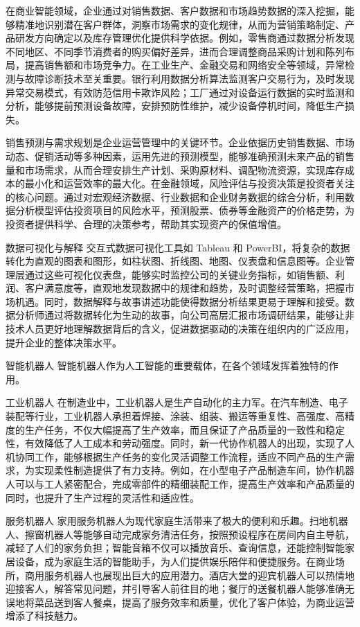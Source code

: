 在商业智能领域，企业通过对销售数据、客户数据和市场趋势数据的深入挖掘，能够精准地识别潜在客户群体，洞察市场需求的变化规律，从而为营销策略制定、产品研发方向确定以及库存管理优化提供科学依据。例如，零售商通过数据分析发现不同地区、不同季节消费者的购买偏好差异，进而合理调整商品采购计划和陈列布局，提高销售额和市场竞争力。在工业生产、金融交易和网络安全等领域，异常检测与故障诊断技术至关重要。银行利用数据分析算法监测客户交易行为，及时发现异常交易模式，有效防范信用卡欺诈风险；工厂通过对设备运行数据的实时监测和分析，能够提前预测设备故障，安排预防性维护，减少设备停机时间，降低生产损失。



销售预测与需求规划是企业运营管理中的关键环节。企业依据历史销售数据、市场动态、促销活动等多种因素，运用先进的预测模型，能够准确预测未来产品的销售量和市场需求，从而合理安排生产计划、采购原材料、调配物流资源，实现库存成本的最小化和运营效率的最大化。在金融领域，风险评估与投资决策是投资者关注的核心问题。通过对宏观经济数据、行业数据和企业财务数据的综合分析，利用数据分析模型评估投资项目的风险水平，预测股票、债券等金融资产的价格走势，为投资者提供科学、合理的决策参考，帮助其实现资产的保值增值。


数据可视化与解释
交互式数据可视化工具如 Tableau 和 PowerBI，将复杂的数据转化为直观的图表和图形，如柱状图、折线图、地图、仪表盘和信息图等。企业管理层通过这些可视化仪表盘，能够实时监控公司的关键业务指标，如销售额、利润、客户满意度等，直观地发现数据中的规律和趋势，及时调整经营策略，把握市场机遇。同时，数据解释与故事讲述功能使得数据分析结果更易于理解和接受。数据分析师通过将数据转化为生动的故事，向公司高层汇报市场调研结果，能够让非技术人员更好地理解数据背后的含义，促进数据驱动的决策在组织内的广泛应用，提升企业的整体决策水平。


智能机器人
智能机器人作为人工智能的重要载体，在各个领域发挥着独特的作用。


工业机器人
在制造业中，工业机器人是生产自动化的主力军。在汽车制造、电子装配等行业，工业机器人承担着焊接、涂装、组装、搬运等重复性、高强度、高精度的生产任务，不仅大幅提高了生产效率，而且保证了产品质量的一致性和稳定性，有效降低了人工成本和劳动强度。同时，新一代协作机器人的出现，实现了人机协同工作，能够根据生产任务的变化灵活调整工作流程，适应不同产品的生产需求，为实现柔性制造提供了有力支持。例如，在小型电子产品制造车间，协作机器人可以与工人紧密配合，完成零部件的精细装配工作，提高生产效率和产品质量的同时，也提升了生产过程的灵活性和适应性。


服务机器人
家用服务机器人为现代家庭生活带来了极大的便利和乐趣。扫地机器人、擦窗机器人等能够自动完成家务清洁任务，按照预设程序在房间内自主导航，减轻了人们的家务负担；智能音箱不仅可以播放音乐、查询信息，还能控制智能家居设备，成为家庭生活的智能助手，为人们提供娱乐陪伴和便捷服务。在商业场所，商用服务机器人也展现出巨大的应用潜力。酒店大堂的迎宾机器人可以热情地迎接客人，解答常见问题，并引导客人前往目的地；餐厅的送餐机器人能够准确无误地将菜品送到客人餐桌，提高了服务效率和质量，优化了客户体验，为商业运营增添了科技魅力。


